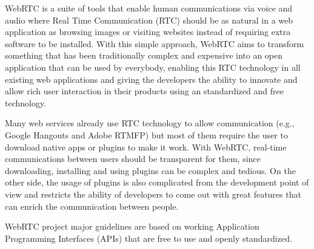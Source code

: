 WebRTC is a suite of tools that enable human communications via voice and audio where Real Time Communication (RTC) should be as natural in a web application as browsing images or visiting websites instead of requiring extra software to be installed. With this simple approach, WebRTC aims to transform something that has been traditionally complex and expensive into an open application that can be used by everybody, enabling this RTC technology in all existing web applications and giving the developers the ability to innovate and allow rich user interaction in their products using an standardized and free technology.

Many web services already use RTC technology to allow communication (e.g., Google Hangouts and Adobe RTMFP) but most of them require the user to download native apps or plugins to make it work. With WebRTC, real-time communications between users should be transparent for them, since downloading, installing and using plugins can be complex and tedious. On the other side, the usage of plugins is also complicated from the development point of view and restricts the ability of developers to come out with great features that can enrich the communication between people.

WebRTC project major guidelines are based on working Application Programming Interfaces (APIs)  that are free to use and openly standardized.


